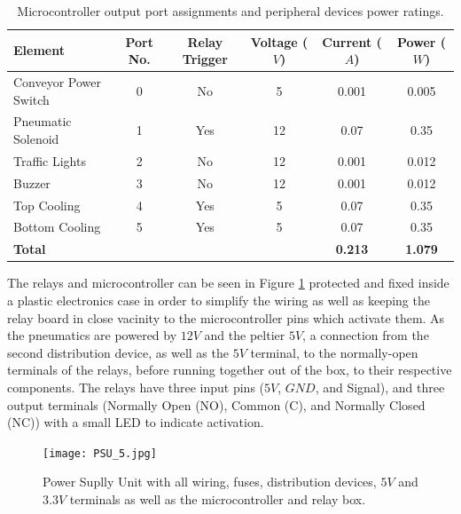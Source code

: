 \documentclass[fleqn,twoside]{article}
\begin{document}
\renewcommand{\arraystretch}{0.8}%
\begin{table}[h]
	\caption{Microcontroller output port assignments and peripheral devices power ratings.}
	\label{tab:micro_pinout_out}
	\begin{tabularx}{\linewidth}{Xccccc}
		\toprule
		\textbf{Element}  & \textbf{Port No.}  & \textbf{Relay Trigger} & \textbf{Voltage ($V$)} & \textbf{Current ($A$)} & \textbf{Power ($W$)}\\[8pt]
		\midrule
		Conveyor Power Switch 	& 0 & No & 5 & 0.001 & 0.005 \\[4pt]
		\midrule
		Pneumatic Solenoid 		& 1 & Yes & 12 & 0.07 & 0.35 \\[4pt]
		\midrule
		Traffic Lights 			& 2 & No & 12 & 0.001 & 0.012 \\[4pt]
		\midrule
		Buzzer 					& 3 & No & 12 & 0.001 & 0.012 \\[4pt]
		\midrule
		Top Cooling 			& 4 & Yes & 5 & 0.07 & 0.35 \\[4pt]
		\midrule
		Bottom Cooling 			& 5 & Yes & 5 & 0.07 & 0.35 \\[4pt]
		\midrule
		\textbf{Total} 			&    &     &   & \textbf{0.213} & \textbf{1.079} \\[4pt]
		\bottomrule
		
	\end{tabularx}
\end{table}


The relays and microcontroller can be seen in Figure \ref{fig:PSU_5} protected and fixed inside a plastic electronics case in order to simplify the wiring as well as keeping the relay board in close vacinity to the microcontroller pins which activate them. As the pneumatics are powered by $12V$ and the peltier $5V$, a connection from the second distribution device, as well as the $5V$ terminal, to the normally-open terminals of the relays, before running together out of the box, to their respective components. The relays have three input pins ($5V$, $GND$, and Signal), and three output terminals (Normally Open (NO), Common (C), and Normally Closed (NC)) with a small LED to indicate activation. 


\begin{figure}
	\begin{center}
		\texttt{[image: PSU\_5.jpg]}
	\end{center}
	\caption{Power Suplly Unit with all wiring, fuses, distribution devices, $5V$ and $3.3V$ terminals as well as the microcontroller and relay box.}
	\label{fig:PSU_5}
\end{figure}
\end{document}
